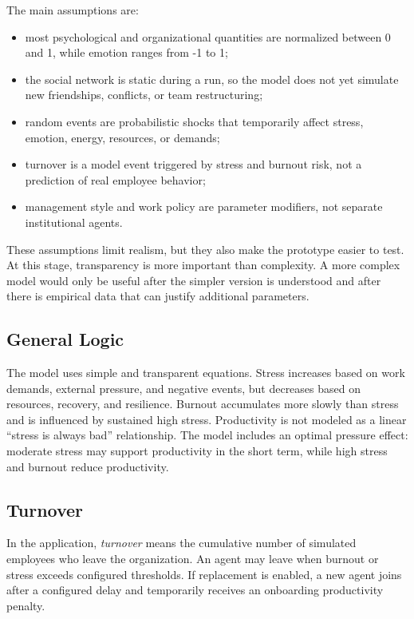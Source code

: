 \documentclass[12pt,a4paper]{article}
\begin{document}
The main assumptions are:

\begin{itemize}
    \item most psychological and organizational quantities are normalized between 0 and 1, while emotion ranges from -1 to 1;
    \item the social network is static during a run, so the model does not yet simulate new friendships, conflicts, or team restructuring;
    \item random events are probabilistic shocks that temporarily affect stress, emotion, energy, resources, or demands;
    \item turnover is a model event triggered by stress and burnout risk, not a prediction of real employee behavior;
    \item management style and work policy are parameter modifiers, not separate institutional agents.
\end{itemize}

These assumptions limit realism, but they also make the prototype easier to test. At this stage, transparency is more important than complexity. A more complex model would only be useful after the simpler version is understood and after there is empirical data that can justify additional parameters.

\subsection{General Logic}

The model uses simple and transparent equations. Stress increases based on work demands, external pressure, and negative events, but decreases based on resources, recovery, and resilience. Burnout accumulates more slowly than stress and is influenced by sustained high stress. Productivity is not modeled as a linear ``stress is always bad'' relationship. The model includes an optimal pressure effect: moderate stress may support productivity in the short term, while high stress and burnout reduce productivity.

\subsection{Turnover}

In the application, \textit{turnover} means the cumulative number of simulated employees who leave the organization. An agent may leave when burnout or stress exceeds configured thresholds. If replacement is enabled, a new agent joins after a configured delay and temporarily receives an onboarding productivity penalty.
\end{document}
